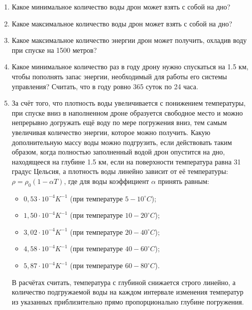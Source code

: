 \begin{enumerate}
    \item Какое минимальное количество воды дрон может взять с собой на дно?
    \item Какое максимальное количество воды дрон может взять с собой на дно?
    \item Какое максимальное количество энергии дрон может получить, охладив воду при спуске на 1500 метров?
    \item Какое минимальное количество раз в году дрону нужно спускаться на 1.5 км, чтобы пополнять запас энергии, 
    необходимый для работы его системы управления? Считать, что в году ровно 365 суток по 24 часа.
    \item За счёт того, что плотность воды увеличивается с понижением температуры, при спуске вниз в 
    наполненном дроне образуется свободное место и можно непрерывно догружать ещё воду по мере погружения 
    вниз, тем самым увеличивая количество энергии, которое можно получить. Какую дополнительную массу 
    воды можно подгрузить, если действовать таким образом, когда полностью заполненный водой дрон опустится 
    на дно, находящееся на глубине 1.5 км, если на поверхности температура равна 31 градус Цельсия, а 
    плотность воды линейно зависит от её температуры: $\rho=\rho_0 (1-\alpha T)$, где для воды коэффициент $\alpha$ 
    принять равным:
    \begin{itemize}
        \item $0,53 \cdot 10^{−4} K^{-1}$ (при температуре $5-10 ^{\circ}C$);
        \item $1,50 \cdot 10^{−4} K^{-1}$ (при температуре $10-20 ^{\circ}C$);
        \item $3,02 \cdot 10^{−4} K^{-1}$ (при температуре $20-40 ^{\circ}C$);
        \item $4,58 \cdot 10^{−4} K^{-1}$ (при температуре $40-60 ^{\circ}C$);
        \item $5,87 \cdot 10^{−4} K^{-1}$ (при температуре $60-80 ^{\circ}C$).
    \end{itemize}

    В расчётах считать, температура с глубиной снижается строго линейно, а количество подгружаемой воды на каждом интервале изменения температур из указанных приблизительно прямо пропорционально глубине погружения.
\end{enumerate}